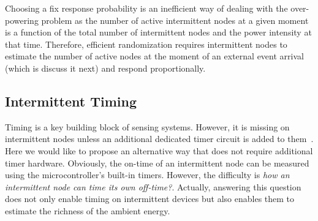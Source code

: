 Choosing a fix response probability is an inefficient way of dealing with the over-powering problem as the number of active intermittent nodes at a given moment is a function of the total number of intermittent nodes and the power intensity at that time. Therefore, efficient randomization requires intermittent nodes to estimate the number of active nodes at the moment of an external event arrival (which is discuss it next) and respond proportionally.


\subsection{Intermittent Timing}

\label{subsec:interTimer}
Timing is a key building block of sensing systems. However, it is missing on intermittent nodes unless an additional dedicated timer circuit is added to them~\cite{hester2017timely}. Here we would like to propose an alternative way that does not require additional timer hardware. Obviously, the on-time of an intermittent node can be measured using the microcontroller's built-in timers. However, the difficulty is \textit{how an intermittent node can time its own off-time?}. Actually, answering this question does not only enable timing on intermittent devices but also enables them to estimate the richness of the ambient energy. 

